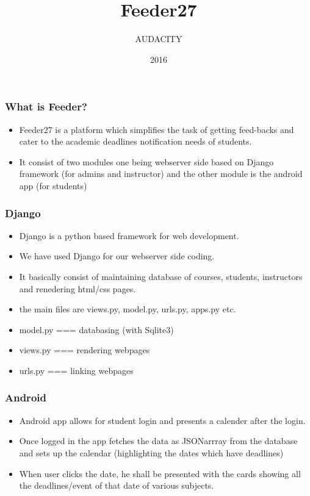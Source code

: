 \documentclass{beamer}
\title{Feeder27}
\author{AUDACITY}
\institute{IIT Bombay}
\date{2016}
\begin{document}
 
\frame{\titlepage}
 
\begin{frame}
\frametitle{What is Feeder?}
\begin{itemize}
    \item Feeder27 is a platform which simplifies the task of getting feed-backs and cater to the academic deadlines notification needs of students.
    \item It consist of two modules one being webserver side based on Django framework (for admins and instructor)  and the other module is the android app (for students)
\end{itemize}
\end{frame}
 
\begin{frame}
\frametitle{Django}
\begin{itemize}
    \item Django is a python based framework for web development.
    \item We have used Django for our webserver side coding.
    \item It basically consist of maintaining database of courses, students, instructors and renedering html/css pages.
    \item the main files are views.py, model.py, urls.py, apps.py etc.
    \item model.py === databasing (with Sqlite3)
    \item views.py === rendering webpages
    \item urls.py === linking webpages
\end{itemize}
\end{frame}

\begin{frame}
\frametitle{Android}
\begin{itemize}
    \item Android app allows for student login and presents a calender after the login.
    \item Once logged in the app fetches the data as JSONarrray from the database and sets up the calendar (highlighting the dates which have deadlines)
    \item When user clicks the date, he shall be presented with the cards showing all the deadlines/event of that date of various subjects.
\end{itemize}
\end{frame}
\end{document}
